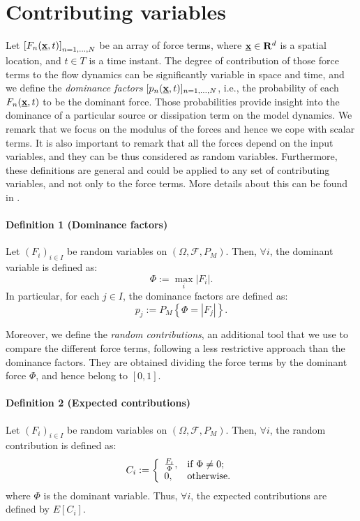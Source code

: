 \documentclass[nhess, manuscript]{copernicus}
\begin{document}
\section{Contributing variables}\label{A-2}
Let $\left[F_n(\underline{\textbf x},t)\right]_{n=1,\dots, N}$ be an array of force terms, where $\underline{\textbf x}\in \mathbf R^d$ is a spatial location, and $t\in T$ is a time instant. The degree of contribution of those force terms to the flow dynamics can be significantly variable in space and time, and we define the \emph{dominance factors} $[p_n(\underline{\textbf x},t)]_{n=1,\dots, N}$, i.e., the probability of each $F_n(\underline{\textbf x},t)$ to be the dominant force. Those probabilities provide insight into the dominance of a particular source or dissipation term on the model dynamics. We remark that we focus on the modulus of the forces and hence we cope with scalar terms. It is also important to remark that all the forces depend on the input variables, and they can be thus considered as random variables. Furthermore, these definitions are general and could be applied to any set of contributing variables, and not only to the force terms. More details about this can be found in \cite{Patra2018}.

\paragraph{Definition 1 (Dominance factors)}
Let $(F_i)_{i\in I}$ be random variables on $(\Omega, \mathcal F, P_M)$. Then, $\forall i$, the dominant variable is defined as:
$$\Phi:=\max_i |F_i|.$$
In particular, for each $j \in I$, the dominance factors are defined as:
$$p_j:=P_M\left\{\Phi=|F_j|\right\}.$$

Moreover, we define the \emph{random contributions}, an additional tool that we use to compare the different force terms, following a less restrictive approach than the dominance factors. They are obtained dividing the force terms by the dominant force $\Phi$, and hence belong to $[0,1]$.

\paragraph{Definition 2 (Expected contributions)}
Let $(F_i)_{i\in I}$ be random variables on $(\Omega, \mathcal F, P_M)$. Then, $\forall i$, the random contribution is defined as:
$$C_i:=\left\{
\begin{array}{ll}
      \frac{F_i}{\Phi}, & \textrm{if }\Phi\neq 0; \\
      0, & \hbox{otherwise.}
    \end{array}
  \right.$$
where $\Phi$ is the dominant variable. Thus, $\forall i$, the expected contributions are defined by $E\left[C_i\right]$.
\end{document}
